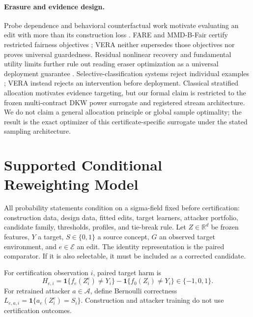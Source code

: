 \paragraph{Erasure and evidence design.}
Probe dependence and behavioral counterfactual work motivate evaluating an
edit with more than its construction loss
\cite{hewitt2019control,pimentel2020probing,voita2020mdl,elazar2021amnesic}.
FARE and MMD-B-Fair certify restricted fairness objectives
\cite{jovanovic2023fare,deka2023mmdbfair}; VERA neither supersedes those
objectives nor proves universal guardedness. Residual nonlinear recovery and
fundamental utility limits further rule out reading eraser optimization as a
universal deployment guarantee \cite{akbari2025obliviator,chowdhury2025limits}.
Selective-classification systems reject individual examples
\cite{elyaniv2010foundations,geifman2017selective,geifman2019selectivenet}; VERA
instead rejects an intervention before deployment. Classical stratified allocation
motivates evidence targeting, but our formal claim is restricted to the frozen
multi-contract DKW power surrogate and registered stream architecture. We do
not claim a general allocation principle or global sample optimality; the
result is the exact optimizer of this certificate-specific surrogate under the
stated sampling architecture.

\section{Supported Conditional Reweighting Model}
\label{neurips:sec:model}

All probability statements condition on a sigma-field fixed before
certification: construction data, design data, fitted edits, target learners,
attacker portfolio, candidate family, thresholds, profiles, and tie-break rule.
Let $Z\in\mathbb R^d$ be frozen features, $Y$ a target, $S\in\{0,1\}$ a source
concept, $G$ an observed target environment, and $e\in\mathcal E$ an edit. The
identity representation is the paired comparator. If it is also selectable,
it must be included as a corrected candidate.

For certification observation $i$, paired target harm is
\begin{equation}
H_{e,i}=\mathbf 1\{f_e(Z_i^e)\ne Y_i\}
-\mathbf 1\{f_0(Z_i)\ne Y_i\}\in\{-1,0,1\}.
\label{neurips:eq:harm}
\end{equation}
For retrained attacker $a\in\mathcal A$, define Bernoulli correctness
$L_{e,a,i}=\mathbf 1\{a_e(Z_i^e)=S_i\}$. Construction and attacker training do
not use certification outcomes.

